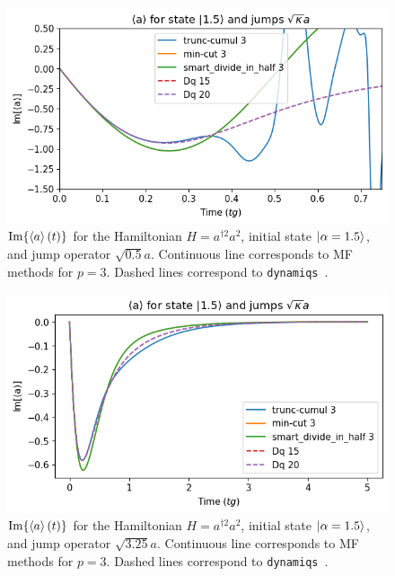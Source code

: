 \begin{center}
    \begin{figure}[h!]
      \centering
      \includegraphics[width=0.9\linewidth]{Pics/Eg_H_Kerr_1Loss.pdf}
      \caption{$\Im{\left\langle a \right\rangle(t)}$ for the Hamiltonian $H = a^{\dagger 2} a^2$, initial state $\ket{\alpha = 1.5}$, and jump operator $\sqrt{0.5} a$. Continuous line corresponds to MF methods for $p=3$. Dashed lines correspond to \texttt{dynamiqs}~\cite{dynamiqs}.}
      \label{fig:Eg_H_Kerr_1Loss}
    \end{figure}
\end{center}

\begin{center}
    \begin{figure}[h!]
      \centering
      \includegraphics[width=0.9\linewidth]{Pics/Eg_H_Kerr_1Loss_stqble.pdf}
      \caption{$\Im{\left\langle a \right\rangle(t)}$ for the Hamiltonian $H = a^{\dagger 2} a^2$, initial state $\ket{\alpha = 1.5}$, and jump operator $\sqrt{3.25} a$. Continuous line corresponds to MF methods for $p=3$. Dashed lines correspond to \texttt{dynamiqs}~\cite{dynamiqs}.}
      \label{fig:Eg_H_Kerr_1Loss_stqble}
    \end{figure}
\end{center}

